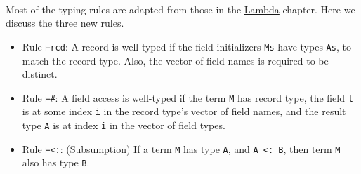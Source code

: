 \begin{fence}
\begin{code}
%
\>[2]\AgdaSpace{}%
\AgdaSymbol{:}\AgdaSpace{}%
\AgdaSpace{}%
\AgdaSymbol{\{}\AgdaSymbol{\}\{}\AgdaSpace{}%
\AgdaSymbol{\}\{}\AgdaSpace{}%
\AgdaSymbol{:}\AgdaSpace{}%
\AgdaSpace{}%
\AgdaSpace{}%
\AgdaSymbol{\}\{}\AgdaSymbol{\}\{}\AgdaSpace{}%
\AgdaSymbol{:}\AgdaSpace{}%
\AgdaSpace{}%
\AgdaSpace{}%
\AgdaSymbol{\}}\<%
\\
\>[2][@{}l@{\AgdaIndent{0}}]%
\>[5]\AgdaSpace{}%
\AgdaSpace{}%
\AgdaSpace{}%
\AgdaSpace{}%
\AgdaSpace{}%
\<%
\\
%
\>[5]\AgdaSpace{}%
\AgdaSpace{}%
\AgdaSpace{}%
\AgdaSpace{}%
\AgdaSpace{}%
\<%
\\
%
\>[5]\AgdaSpace{}%
\AgdaSpace{}%
\AgdaSpace{}%
\AgdaSymbol{(}\AgdaSpace{}%
\AgdaSpace{}%
\AgdaSymbol{)}\AgdaSpace{}%
\AgdaSpace{}%
\AgdaSymbol{(}\AgdaSpace{}%
\AgdaSpace{}%
\AgdaSymbol{)}\<%
\end{code}
\end{fence}

Most of the typing rules are adapted from those in the
\protect\hyperlink{Lambda}{Lambda} chapter. Here we discuss the three
new rules.

\begin{itemize}
\item
  Rule \texttt{⊢rcd}: A record is well-typed if the field initializers
  \texttt{Ms} have types \texttt{As}, to match the record type. Also,
  the vector of field names is required to be distinct.
\item
  Rule \texttt{⊢\#}: A field access is well-typed if the term \texttt{M}
  has record type, the field \texttt{l} is at some index \texttt{i} in
  the record type's vector of field names, and the result type
  \texttt{A} is at index \texttt{i} in the vector of field types.
\item
  Rule \texttt{⊢\textless{}:}: (Subsumption) If a term \texttt{M} has
  type \texttt{A}, and \texttt{A\ \textless{}:\ B}, then term \texttt{M}
  also has type \texttt{B}.
\end{itemize}

